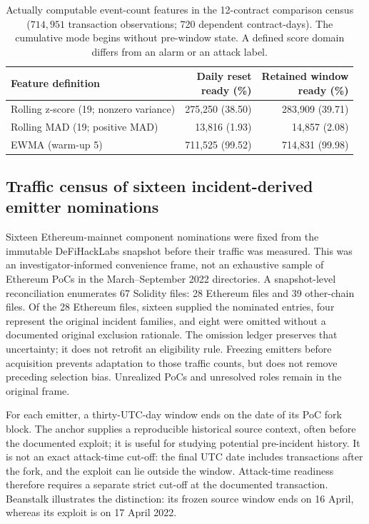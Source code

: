 \documentclass[preprint,12pt,authoryear]{elsarticle}
\begin{document}
\begin{table}[htbp]
\centering\small
\caption{Actually computable event-count features in the 12-contract comparison census ($714{,}951$ transaction observations; 720 dependent contract-days). The cumulative mode begins without pre-window state. A defined score domain differs from an alarm or an attack label.}
\label{tab:runtime}
\begin{tabularx}{\linewidth}{@{}>{\raggedright\arraybackslash}X r r@{}}
\toprule
Feature definition & \shortstack{Daily reset\\ready (\%)} & \shortstack{Retained window\\ready (\%)}\\
\midrule
Rolling z-score (19; nonzero variance) & 275,250 (38.50) & 283,909 (39.71)\\
Rolling MAD (19; positive MAD) & 13,816 (1.93) & 14,857 (2.08)\\
EWMA (warm-up 5) & 711,525 (99.52) & 714,831 (99.98)\\
\bottomrule
\end{tabularx}
\end{table}

\subsection{Traffic census of sixteen incident-derived emitter nominations}\label{sec:sourcecensus}
Sixteen Ethereum-mainnet component nominations were fixed from the immutable DeFiHackLabs snapshot \citep{DeFiHackLabs2026} before their traffic was measured. This was an investigator-informed convenience frame, not an exhaustive sample of Ethereum PoCs in the March--September 2022 directories. A snapshot-level reconciliation enumerates 67 Solidity files: 28 Ethereum files and 39 other-chain files. Of the 28 Ethereum files, sixteen supplied the nominated entries, four represent the original incident families, and eight were omitted without a documented original exclusion rationale. The omission ledger preserves that uncertainty; it does not retrofit an eligibility rule. Freezing emitters before acquisition prevents adaptation to those traffic counts, but does not remove preceding selection bias. Unrealized PoCs and unresolved roles remain in the original frame.

For each emitter, a thirty-UTC-day window ends on the date of its PoC fork block. The anchor supplies a reproducible historical source context, often before the documented exploit; it is useful for studying potential pre-incident history. It is not an exact attack-time cut-off: the final UTC date includes transactions after the fork, and the exploit can lie outside the window. Attack-time readiness therefore requires a separate strict cut-off at the documented transaction. Beanstalk illustrates the distinction: its frozen source window ends on 16 April, whereas its exploit is on 17 April 2022.
\end{document}
